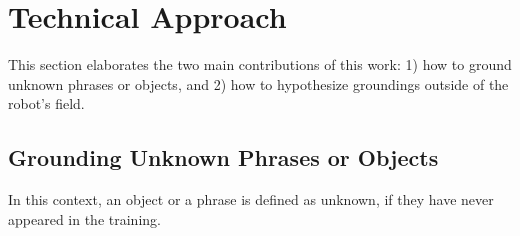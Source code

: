 \section{Technical Approach} \label{sec:technical}

This section elaborates the two main contributions of this work: 1) how to ground unknown phrases or objects, and 2) how to hypothesize groundings outside of the robot's field.

\subsection{Grounding Unknown Phrases or Objects}

In this context, an object or a phrase is defined as unknown, if they have never appeared in the training. 






